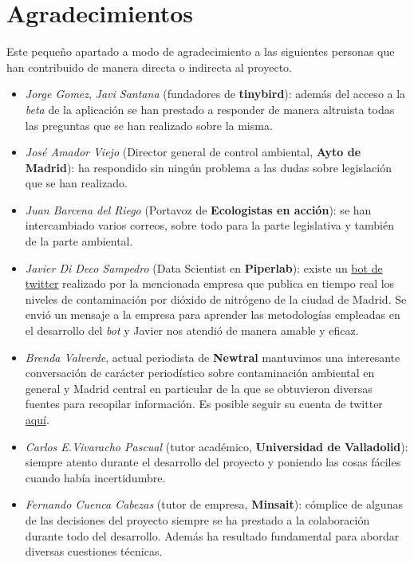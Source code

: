 \section{Agradecimientos}\label{reconocimientos}
Este pequeño apartado a modo de agradecimiento a las siguientes personas que han contribuido de manera directa o indirecta al proyecto.
\begin{itemize}
	\item \textit{Jorge Gomez}, \textit{Javi Santana} (fundadores de \textbf{tinybird}): además del acceso a la \textit{beta} de la aplicación se han prestado a responder de manera altruista todas las preguntas que se han realizado sobre la misma.
	\item \textit{José Amador Viejo} (Director general de control ambiental, \textbf{Ayto de Madrid}): ha respondido sin ningún problema a las dudas sobre legislación que se han realizado.
	\item \textit{Juan Barcena del Riego} (Portavoz de \textbf{Ecologistas en acción}): se han intercambiado varios correos, sobre todo para la parte legislativa y también de la parte ambiental.
	\item \textit{Javier Di Deco Sampedro} (Data Scientist en \textbf{Piperlab}): existe un \href{https://twitter.com/datoxnitro_bot}{bot de twitter} realizado por la mencionada empresa que publica en tiempo real los niveles de contaminación por dióxido de nitrógeno de la ciudad de Madrid. Se envió un mensaje a la empresa para aprender las metodologías empleadas en el desarrollo del \textit{bot} y Javier nos atendió de manera amable y eficaz.
	\item \textit{Brenda Valverde}, actual periodista de \textbf{Newtral} mantuvimos una interesante conversación de carácter periodístico sobre contaminación ambiental en general y Madrid central en particular de la que se obtuvieron diversas fuentes para recopilar información. Es posible seguir su cuenta de twitter \href{https://twitter.com/brbrebren}{aquí}.
	\item \textit{Carlos E.Vivaracho Pascual} (tutor académico, \textbf{Universidad de Valladolid}): siempre atento durante el desarrollo del proyecto y poniendo las cosas fáciles cuando había incertidumbre.
    \item \textit{Fernando Cuenca Cabezas} (tutor de empresa, \textbf{Minsait}): cómplice de algunas de las decisiones del proyecto siempre se ha prestado a la colaboración durante todo del desarrollo. Además ha resultado fundamental para abordar diversas cuestiones técnicas.
\end{itemize}

